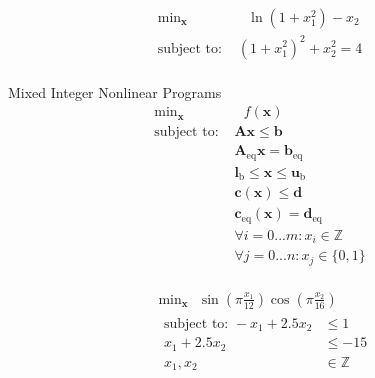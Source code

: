 \documentclass{article}
\begin{document}
\begin{align*}
    \text{min}_{\mathbf{x}}& \text{ } \ln\left(1 + x_1^2\right) - x_2\\
    \mbox{subject to: }& \left(1 + x_1^2\right)^2 + x_2^2 = 4\\
\end{align*}

Mixed Integer Nonlinear Programs
\begin{align*}
    \text{min}_{\mathbf{x}}& \text{ } f\left(\mathbf{x}\right) \\
    \mbox{subject to: }& \mathbf{A}\mathbf{x} \le \mathbf{b}\\
                       & \mathbf{A}_{\text{eq}}\mathbf{x} = \mathbf{b}_{\text{eq}}\\
                       & \mathbf{l}_{\text{b}} \le \mathbf{x} \le \mathbf{u}_{\text{b}}\\
                       & \mathbf{c}\left(\mathbf{x}\right) \le \mathbf{d}\\
                       & \mathbf{c}_{\text{eq}}\left(\mathbf{x}\right) = \mathbf{d}_{\text{eq}}\\
                       & \forall i = 0...m : x_i \in \mathbb{Z}\\
                       & \forall j = 0...n : x_j \in \{0,1\}\\
\end{align*}

\begin{align*}
    &\text{min}_{\mathbf{x}} \text{ } \sin\left(\pi \frac{x_1}{12}\right)\cos\left(\pi \frac{x_2}{16}\right)\\
    &\begin{aligned}
    \mbox{subject to: } -x_1 + 2.5x_2 &\le 1\\
                          x_1 + 2.5x_2 &\le -15\\
                          x_1,x_2 &\in \mathbb{Z}\\
    \end{aligned}
\end{align*}
\end{document}
